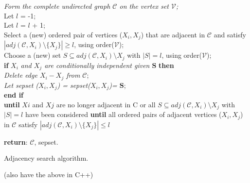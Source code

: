 \documentclass[7pt]{article}
\begin{document}
\begin{algorithm}
	
	\vspace{0.1in}
	\vspace{0.05in}
	\emph{Form the complete undirected graph $\mathcal{C}$ on the vertex set $\mathcal{V}$;} \\
		\vspace{0.05in}
			Let $l$ = -1; \\
	{
		Let $l$ = $l$  + 1; \\
		{
			Select a (new) ordered pair of vertices ($X_i, X_j$) that are adjacent in $\mathcal{C}$  and satisfy $|adj(\mathcal{C}, X_i) \setminus \{X_j\}| \geq l$, using order($\mathcal{V}$);\\
			{
			Choose a (new) set $S \subseteq adj(\mathcal{C}, X_i) \setminus {X_j}$ with $|S| = l$, using order($\mathcal{V}$); \\
			\textbf{if} $X_i$ \emph{and $X_j$  are conditionally independent given $\mathbf{S}$}  \textbf{then} \\
			\hspace{0.25in} \emph{Delete edge $X_i - X_j$ from $\mathcal{C}$}; \\
			\hspace{0.25in} \emph{Let sepset ($X_i, X_j$) = sepset($X_i, X_j$)= $\mathbf{S}$};\\
			\textbf{end if} \\
			\textbf{until} $Xi$ and $Xj$ are no longer adjacent in C or all $S \subseteq adj(\mathcal{C}, X_i) \setminus {X_j}$ with $|S|  = l$ have been considered
		}
		\textbf{until} all ordered pairs of adjacent vertices ($X_i, X_j$) in $\mathcal{C}$ satisfy $| adj(\mathcal{C}, X_i) \setminus \{ {X_j} \}| \leq l$
	}
	}

 \textbf{return}: $\mathcal{C}$, sepset.
 \caption{Adjacency search algorithm.}
 (also have the above in C++)
\end{algorithm}
\end{document}
